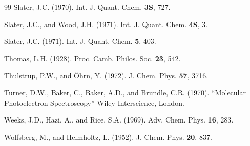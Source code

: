 \documentclass[12pt,letterpaper]{report}
\begin{document}
\begin{thebibliography}{99}
 Slater, J.C. (1970). Int. J. Quant. Chem. \textbf{3S}, 727.

 Slater, J.C., and Wood, J.H. (1971). Int. J. Quant. Chem. \textbf{4S}, 3.

 Slater, J.C. (1971). Int. J. Quant. Chem. \textbf{5}, 403.

 Thomas, L.H. (1928). Proc. Camb. Philos. Soc. \textbf{23}, 542.

 Thulstrup, P.W., and Öhrn, Y. (1972). J. Chem. Phys. \textbf{57}, 3716.

 Turner, D.W., Baker, C., Baker, A.D., and Brundle, C.R. (1970). ``Molecular Photoelectron Spectroscopy'' Wiley-Interscience, London.

 Weeks, J.D., Hazi, A., and Rice, S.A. (1969). Adv. Chem. Phys. \textbf{16}, 283.

 Wolfsberg, M., and Helmholtz, L. (1952). J. Chem. Phys. \textbf{20}, 837.

\end{thebibliography}
\end{document}
